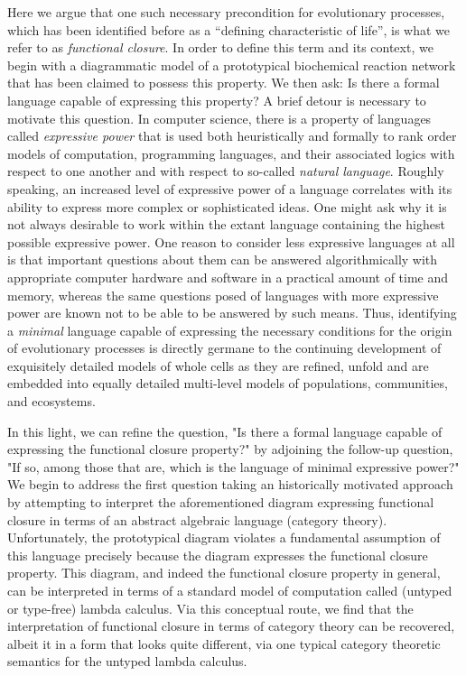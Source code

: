 Here we argue that one such necessary precondition for evolutionary processes, which has been identified before as a ``defining characteristic of life'', is what we refer to as \emph{functional closure}. In order to define this term and its context, we begin with a diagrammatic model of a prototypical biochemical reaction network that has been claimed to possess this property. We then ask: Is there a formal language capable of expressing this property? A brief detour is necessary to motivate this question. In computer science, there is a property of languages called \emph{expressive power} that is used both heuristically and formally to rank order models of computation, programming languages, and their associated logics with respect to one another and with respect to so-called \emph{natural language}. Roughly speaking, an increased level of expressive power of a language correlates with its ability to express more complex or sophisticated ideas. One might ask why it is not always desirable to work within the extant language containing the highest possible expressive power. One reason to consider less expressive languages at all is that important questions about them can be answered algorithmically with appropriate computer hardware and software in a practical amount of time and memory, whereas the same questions posed of languages with more expressive power are known not to be able to be answered by such means. Thus, identifying a \emph{minimal} language capable of expressing the necessary conditions for the origin of evolutionary processes is directly germane to the continuing development of exquisitely detailed models of whole cells as they are refined, unfold and are embedded into equally detailed multi-level models of populations, communities, and ecosystems.

In this light, we can refine the question, "Is there a formal language capable of expressing the functional closure property?" by adjoining the follow-up question, "If so, among those that are, which is the language of minimal expressive power?" We begin to address the first question taking an historically motivated approach  by attempting to interpret the aforementioned diagram expressing functional closure in terms of an abstract algebraic language (category theory). Unfortunately, the prototypical diagram violates a fundamental assumption of this language precisely because the diagram expresses the functional closure property. This diagram, and indeed the functional closure property in general, can be interpreted in terms of a standard model of computation called (untyped or type-free) lambda calculus. Via this conceptual route, we find that the interpretation of functional closure in terms of category theory can be recovered, albeit it in a form that looks quite different, via one typical category theoretic semantics for the untyped lambda calculus.

